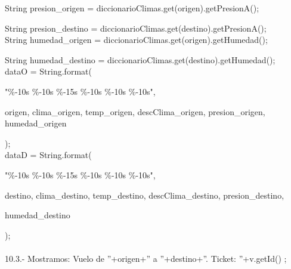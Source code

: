 \documentclass[30pt]{article}
\theoremstyle{definition}
\begin{document}
  \hspace{3cm} String presion\_origen = diccionarioClimas.get(origen).getPresionA();
  
  \hspace{3cm} String presion\_destino = diccionarioClimas.get(destino).getPresionA();\\

  \hspace{3cm} String humedad\_origen = diccionarioClimas.get(origen).getHumedad();
  
  \hspace{3cm} String humedad\_destino = diccionarioClimas.get(destino).getHumedad();\\
  
  \hspace{3cm} dataO = String.format(
  
  \hspace{3cm} "\%-10s \%-10s \%-15s \%-10s \%-10s \%-10s",
  
    \hspace{3cm} origen, \hspace{0.5cm} clima\_origen, \hspace{0.5cm}temp\_origen, \hspace{0.5cm} descClima\_origen, \hspace{0.5cm}presion\_origen, \hspace{0.5cm}humedad\_origen
    
  \hspace{3cm} );\\

  \hspace{3cm} dataD = String.format(
  
  \hspace{3cm} "\%-10s \%-10s \%-15s \%-10s \%-10s \%-10s",
  
  \hspace{3cm} destino, \hspace{0.5cm} clima\_destino, \hspace{0.5cm}temp\_destino, \hspace{0.5cm} descClima\_destino, \hspace{0.5cm}presion\_destino,  
  
    \hspace{3cm}humedad\_destino
    
    \hspace{3cm} );\\ \\
    
    \hspace{2cm} 10.3.- Mostramos: Vuelo de ''+origen+'' a ''+destino+''. Ticket: ''+v.getId() ;
    
\end{document}
